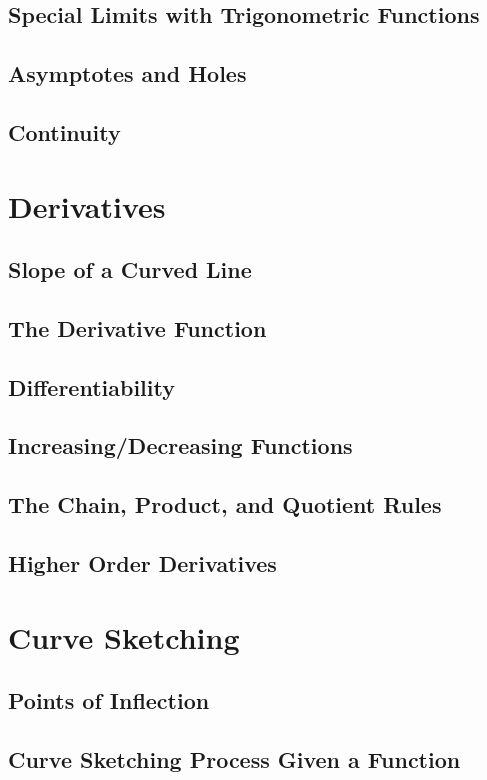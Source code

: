 \documentclass[12pt]{article}
\begin{document}
        \subsection{Special Limits with Trigonometric Functions}
        \subsection{Asymptotes and Holes}
        \subsection{Continuity}

    \section{Derivatives}
        \subsection{Slope of a Curved Line}
        \subsection{The Derivative Function}
        \subsection{Differentiability}
        \subsection{Increasing/Decreasing Functions}
        \subsection{The Chain, Product, and Quotient Rules}
        \subsection{Higher Order Derivatives}

    \section{Curve Sketching}
        \subsection{Points of Inflection}
        \subsection{Curve Sketching Process Given a Function}
    
\end{document}
